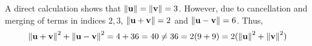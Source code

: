 \documentclass[12pt]{article}%
\begin{document}
\begin{enumerate}
A direct calculation shows that $\norm{\textbf{u}} = \norm{\textbf{v}} = 3$. However, due to cancellation and merging of terms in indices $2,3$, $\norm{\textbf{u} + \textbf{v}} = 2$ and $\norm{\textbf{u} - \textbf{v}} = 6$. Thus,
\begin{equation*}
  \norm{\textbf{u} + \textbf{v}}^2 + \norm{\textbf{u} - \textbf{v}}^2 = 4 + 36 = 40 \neq 36 = 2(9 + 9) = 2(\norm{\textbf{u}}^2 + \norm{\textbf{v}}^2)
\end{equation*}
\end{enumerate}
\end{document}
